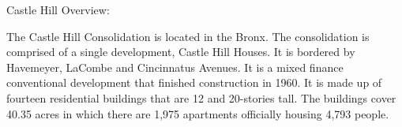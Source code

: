 Castle Hill Overview:   

    

The Castle Hill Consolidation is located in the Bronx. The consolidation is comprised of a single development, Castle Hill Houses. It is bordered by Havemeyer, LaCombe and Cincinnatus Avenues. It is a mixed finance conventional development that finished construction in 1960. It is made up of fourteen residential buildings that are 12 and 20-stories tall. The buildings cover 40.35 acres in which there are 1,975 apartments officially housing 4,793 people.